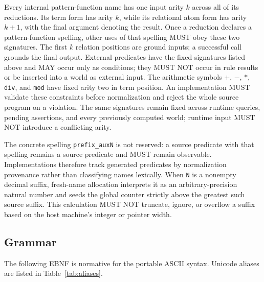 \documentclass[11pt]{article}
\begin{document}
Every internal pattern-function name has one input arity $k$ across all of its
reductions.  Its term form has arity $k$, while its relational atom form has
arity $k+1$, with the final argument denoting the result.  Once a reduction
declares a pattern-function spelling, other uses of that spelling MUST obey
these two signatures.  The first $k$ relation positions are ground inputs; a
successful call grounds the final output.  External predicates have the fixed
signatures listed above and MAY occur only as conditions; they MUST NOT occur
in rule results or be inserted into a world as external input.  The arithmetic symbols $+$, $-$,
$*$, \verb|div|, and \verb|mod| have fixed arity two in term position.  An
implementation MUST validate these constraints before normalization and reject
the whole source program on a violation.  The same signatures remain fixed
across runtime queries, pending assertions, and every previously computed
world; runtime input MUST NOT introduce a conflicting arity.

The concrete spelling \verb|prefix_auxN| is not reserved: a source predicate
with that spelling remains a source predicate and MUST remain observable.
Implementations therefore track generated predicates by normalization
provenance rather than classifying names lexically.  When \texttt{N} is a
nonempty decimal suffix, fresh-name allocation interprets it as an
arbitrary-precision natural number and seeds the global counter strictly above
the greatest such source suffix.  This calculation MUST NOT truncate, ignore,
or overflow a suffix based on the host machine's integer or pointer width.

\subsection{Grammar}

The following EBNF is normative for the portable ASCII syntax.  Unicode
aliases are listed in Table~\ref{tab:aliases}.
\end{document}

